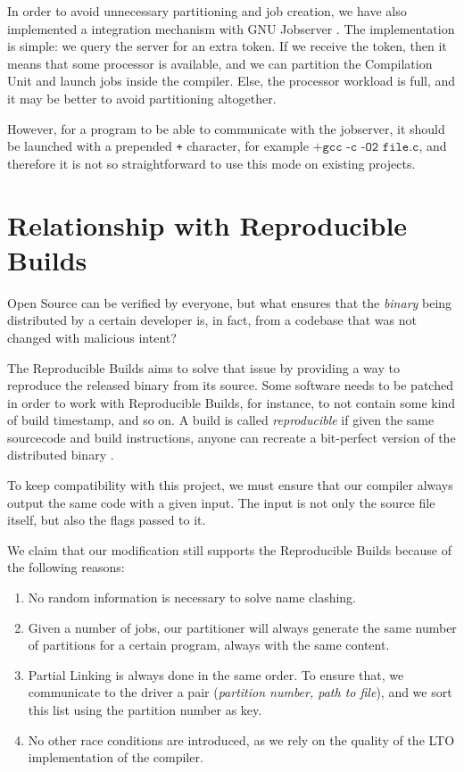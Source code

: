\documentclass[runningheads]{llncs}
\begin{document}
In order to avoid unnecessary partitioning and job creation, we have also
implemented a integration mechanism with GNU Jobserver \cite{posixjobserver}.
The implementation
is simple: we query the server for an extra token. If we receive the token,
then it means that some processor is available, and we can partition the
Compilation Unit and launch jobs inside the compiler. Else, the processor
workload is full, and it may be better to avoid partitioning altogether.

However, for a program to be able to communicate with the jobserver,
it should be launched with a prepended \texttt{+} character,
for example $\texttt{+gcc -c -O2 file.c}$, and therefore it is not
so straightforward to use this mode on existing projects.

\section{Relationship with Reproducible Builds}

Open Source can be verified by everyone, but what ensures that the
\textit{binary} being distributed by a certain developer is, in fact, from a codebase
that was not changed with malicious intent?

The Reproducible Builds aims to solve that issue by providing a way to
reproduce the released binary from its source. Some software needs to
be patched in order to work with Reproducible Builds, for instance,
to not contain some kind of build timestamp, and so on. A build
is called \textit{reproducible} if given the same sourcecode and build
instructions, anyone can recreate a bit-perfect version of the distributed
binary \cite{reproducible_builds}.

To keep compatibility with this project, we must ensure that our compiler
always output the same code with a given input. The input is not only
the source file itself, but also the flags passed to it.

We claim that our modification still supports the Reproducible Builds because
of the following reasons:

\begin{enumerate}
	\item No random information is necessary to solve name clashing.
	\item Given a number of jobs, our partitioner will always generate
	the same number of partitions for a certain program, always with the same content.
	\item Partial Linking is always done in the same order. To ensure that,
	we communicate to the driver a pair (\textit{partition number, path to file}),
	and we sort this list using the partition number as key.
	\item No other race conditions are introduced, as we rely on the quality of
	the LTO implementation of the compiler.
\end{enumerate}
\end{document}
